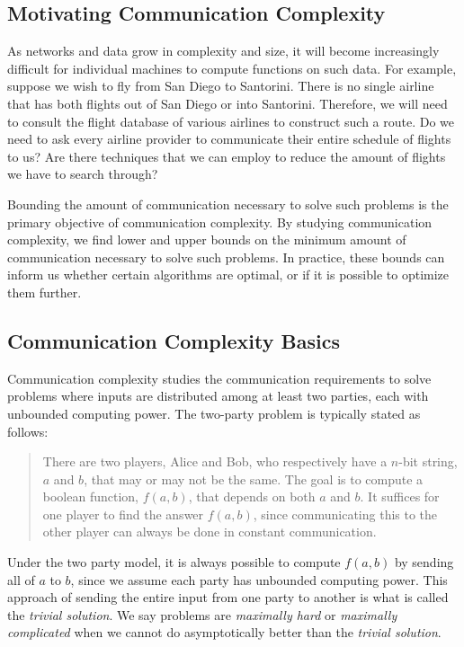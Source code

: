\subsection{Motivating Communication Complexity}
\label{ex:motivating-problem}

As networks and data grow in complexity and size, it will become increasingly difficult for individual machines to compute functions on such data. For example, suppose we wish to fly from San Diego to Santorini. There is no single airline that has both flights out of San Diego or into Santorini. Therefore, we will need to consult the flight database of various airlines to construct such a route. Do we need to ask every airline provider to communicate their entire schedule of flights to us? Are there techniques that we can employ to reduce the amount of flights we have to search through?

Bounding the amount of communication necessary to solve such problems is the primary objective of communication complexity. By studying communication complexity, we find lower and upper bounds on the minimum amount of communication necessary to solve such problems. In practice, these bounds can inform us whether certain algorithms are optimal, or if it is possible to optimize them further.

\subsection{Communication Complexity Basics}

Communication complexity studies the communication requirements to solve problems where inputs are distributed among at least two parties, each with unbounded computing power. The two-party problem is typically stated as follows:
\begin{quote}
    There are two players, Alice and Bob, who respectively have a $n$-bit string, $a$ and $b$, that may or may not be the same. The goal is to compute a boolean function, $f(a, b)$, that depends on both $a$ and $b$. It suffices for one player to find the answer $f(a,b)$, since communicating this to the other player can always be done in constant communication.
\end{quote}
Under the two party model, it is always possible to compute $f(a,b)$ by sending all of $a$ to $b$, since we assume each party has unbounded computing power. This approach of sending the entire input from one party to another is what is called the \textit{trivial solution}. We say problems are \textit{maximally hard} or \textit{maximally complicated} when we cannot do asymptotically better than the \textit{trivial solution}. 

